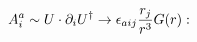 \begin{equation}  A_i^a  \sim  U \cdot {\partial_i  }  U^{\dagger}   \to      \epsilon_{aij}  { r_j  \over     r^3}   G(r): 
 \end{equation} 

